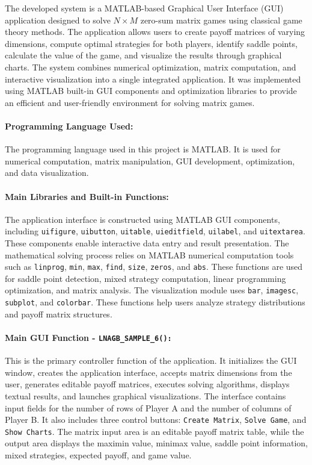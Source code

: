 \documentclass[12pt,a4paper]{article}
\begin{document}
The developed system is a MATLAB-based Graphical User Interface (GUI) application designed to solve \(N \times M\) zero-sum matrix games using classical game theory methods. The application allows users to create payoff matrices of varying dimensions, compute optimal strategies for both players, identify saddle points, calculate the value of the game, and visualize the results through graphical charts. The system combines numerical optimization, matrix computation, and interactive visualization into a single integrated application. It was implemented using MATLAB built-in GUI components and optimization libraries to provide an efficient and user-friendly environment for solving matrix games.
\paragraph{Programming Language Used:}

The programming language used in this project is MATLAB. It is used for numerical computation, matrix manipulation, GUI development, optimization, and data visualization.

\paragraph{Main Libraries and Built-in Functions:}

The application interface is constructed using MATLAB GUI components, including \texttt{uifigure}, \texttt{uibutton}, \texttt{uitable}, \texttt{uieditfield}, \texttt{uilabel}, and \texttt{uitextarea}. These components enable interactive data entry and result presentation. The mathematical solving process relies on MATLAB numerical computation tools such as \texttt{linprog}, \texttt{min}, \texttt{max}, \texttt{find}, \texttt{size}, \texttt{zeros}, and \texttt{abs}. These functions are used for saddle point detection, mixed strategy computation, linear programming optimization, and matrix analysis. The visualization module uses \texttt{bar}, \texttt{imagesc}, \texttt{subplot}, and \texttt{colorbar}. These functions help users analyze strategy distributions and payoff matrix structures.

\paragraph{Main GUI Function - \texttt{LNAGB\_SAMPLE\_6():}}

This is the primary controller function of the application. It initializes the GUI window, creates the application interface, accepts matrix dimensions from the user, generates editable payoff matrices, executes solving algorithms, displays textual results, and launches graphical visualizations. The interface contains input fields for the number of rows of Player A and the number of columns of Player B. It also includes three control buttons: \texttt{Create Matrix}, \texttt{Solve Game}, and \texttt{Show Charts}. The matrix input area is an editable payoff matrix table, while the output area displays the maximin value, minimax value, saddle point information, mixed strategies, expected payoff, and game value.
\end{document}
